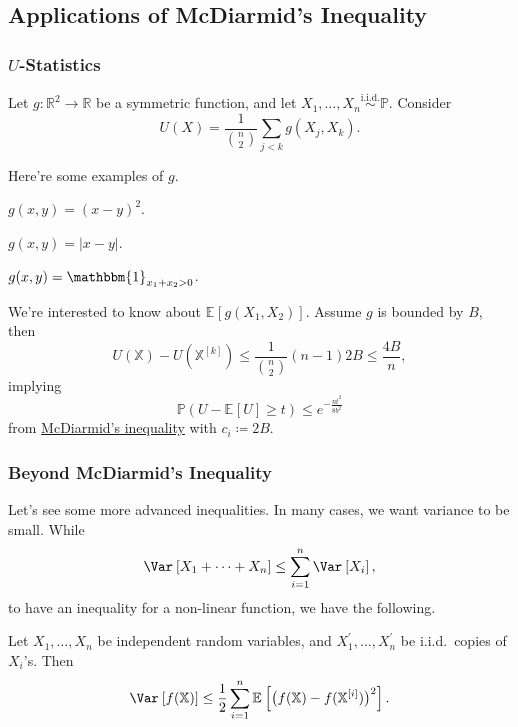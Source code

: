 \subsection{Applications of McDiarmid's Inequality}
\subsubsection{\(U\)-Statistics}

Let \(g\colon \mathbb{R} ^2 \to \mathbb{R} \) be a symmetric function, and let \(X_1, \dots , X_n \overset{\text{i.i.d.} }{\sim } \mathbb{P} \). Consider
\[
  U(X) = \frac{1}{\binom{n}{2}} \sum_{j < k} g(X_j, X_k).
\]

Here're some examples of \(g\).
\begin{eg}
  \(g(x, y) = (x - y)^2\).
\end{eg}

\begin{eg}
  \(g(x, y) = \vert x - y \vert \).
\end{eg}

\begin{eg}
  \(g(x, y) = \mathbbm{1}_{x_1 + x_2 > 0} \).
\end{eg}

We're interested to know about \(\mathbb{E}_{}\left[g(X_1, X_2) \right] \). Assume \(g\) is bounded by \(B\), then
\[
  U(\mathbb{X}) - U(\mathbb{X}^{[k]}) \leq \frac{1}{\binom{n}{2}} (n-1) 2B \leq \frac{4B}{n},
\]
implying
\[
  \mathbb{P} (U - \mathbb{E}_{}\left[U \right] \geq t) \leq e^{-\frac{nt^2}{8b^2}}
\]
from \hyperref[thm:McDiarmid-inequality]{McDiarmid's inequality} with \(c_i \coloneqq 2B\).

\subsubsection{Beyond McDiarmid's Inequality}
Let's see some more advanced inequalities. In many cases, we want variance to be small. While
\[
  \Var_{}\left[X_1 + \dots + X_n \right] \leq \sum_{i=1}^{n} \Var_{}\left[X_i \right],
\]
to have an inequality for a non-linear function, we have the following.

\begin{theorem}\label{thm:Efron-Stein-inequality}
  Let \(X_1, \dots , X_n\) be independent random variables, and \(X_1^{\prime} , \dots , X_n^{\prime} \) be i.i.d.\ copies of \(X_i\)'s. Then
  \[
    \Var_{}\left[f(\mathbb{X}) \right] \leq \frac{1}{2} \sum_{i=1}^{n} \mathbb{E}_{}\left[\big(f(\mathbb{X}) - f(\mathbb{X}^{[i]}) \big)^2 \right].
  \]
\end{theorem}

